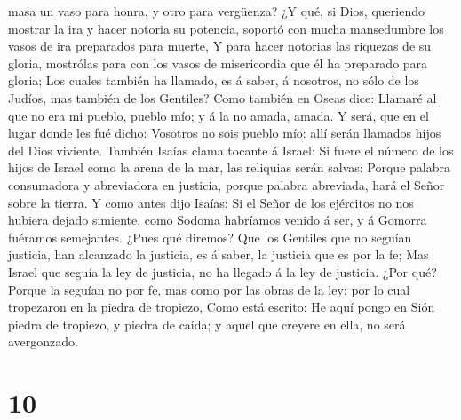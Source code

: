 masa un vaso para honra, y otro para vergüenza?  ¿Y qué,
si Dios, queriendo mostrar la ira y hacer notoria su potencia, soportó
con mucha mansedumbre los vasos de ira preparados para muerte,
 Y para hacer notorias las riquezas de su gloria,
mostrólas para con los vasos de misericordia que él ha preparado para
gloria;  Los cuales también ha llamado, es á saber, á
nosotros, no sólo de los Judíos, mas también de los Gentiles?
 Como también en Oseas dice: Llamaré al que no era mi
pueblo, pueblo mío; y á la no amada, amada.  Y será, que
en el lugar donde les fué dicho: Vosotros no sois pueblo mío: allí serán
llamados hijos del Dios viviente.  También Isaías clama
tocante á Israel: Si fuere el número de los hijos de Israel como la
arena de la mar, las reliquias serán salvas:  Porque
palabra consumadora y abreviadora en justicia, porque palabra abreviada,
hará el Señor sobre la tierra.  Y como antes dijo Isaías:
Si el Señor de los ejércitos no nos hubiera dejado simiente, como Sodoma
habríamos venido á ser, y á Gomorra fuéramos semejantes. 
¿Pues qué diremos? Que los Gentiles que no seguían justicia, han
alcanzado la justicia, es á saber, la justicia que es por la fe;
 Mas Israel que seguía la ley de justicia, no ha llegado
á la ley de justicia.  ¿Por qué? Porque la seguían no por
fe, mas como por las obras de la ley: por lo cual tropezaron en la
piedra de tropiezo,  Como está escrito: He aquí pongo en
Sión piedra de tropiezo, y piedra de caída; y aquel que creyere en ella,
no será avergonzado.

\hypertarget{section-9}{%
\section{10}\label{section-9}}

